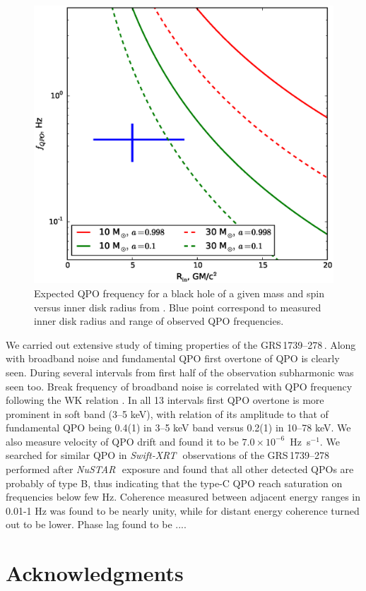 \documentclass[a4paper,fleqn,usenatbib]{mnras}
\def\grs{{GRS\,1739--278\,}}
\def\swiftx{{\em Swift-XRT\,}}
\def\nustar{{\em NuSTAR\,}}
\begin{document}
\begin{figure}
        \includegraphics[width=\columnwidth]{qpoconstr_v02.eps}
        \caption{Expected QPO frequency for a black hole of a given mass and spin versus inner disk radius from \cite{ingram14}. Blue point correspond to measured inner disk radius and range of observed QPO frequencies.}
        \label{fig:qpoconstr}
\end{figure}

We carried out extensive study of timing properties of the \grs. Along with broadband noise and fundamental QPO first overtone of QPO is clearly seen. During several intervals from first half of the observation subharmonic was seen too. Break frequency of broadband noise is correlated with QPO frequency following the WK relation \citep{wijnands99}. 
In all 13 intervals first QPO overtone is more prominent in soft band (3--5 keV), with relation of its amplitude to that of fundamental QPO being 0.4(1) in 3--5 keV band versus 0.2(1) in 10--78 keV.  We also measure velocity of QPO drift and found it to be $7.0\times10^{-6}$~Hz~s$^{-1}$. We searched for similar QPO in \swiftx\, observations of the \grs performed after \nustar\, exposure and found that all other detected QPOs are probably of type B, thus indicating that the type-C QPO reach saturation on frequencies below few Hz. 
Coherence measured between adjacent energy ranges in 0.01-1 Hz was found to be nearly unity, while for distant energy coherence turned out to be lower. Phase lag found to be ....


\section*{Acknowledgments}



\bsp	
\label{lastpage}
\end{document}
